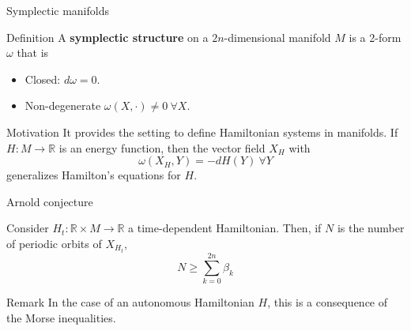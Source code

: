 \documentclass{beamer}
\newcommand{\con}[1]{\mathbb{#1}}
\newcommand{\R}{\con{R}}
\begin{document}
\begin{frame}{Symplectic manifolds}
	\begin{block}{Definition}
		A {\bf symplectic structure} on a $2n$-dimensional manifold $M$ is a 2-form $\omega$ that is
		\begin{itemize}
			\item Closed: $d\omega = 0$.
			\item Non-degenerate $\omega(X,\cdot) \neq 0 \ \forall X$.
		\end{itemize}
	\end{block}

	\begin{block}{Motivation}
		It provides the setting to define Hamiltonian systems in manifolds. If $H : M \rightarrow \R$ is an energy function, then the vector field $X_H$ with
		\[\omega(X_H,Y) = -dH(Y) \ \forall Y\]
		generalizes Hamilton's equations for $H$.
	\end{block}
\end{frame}

\begin{frame}{Arnold conjecture}
	\begin{theorem}
		Consider $H_t : \R \times M \rightarrow \R$ a time-dependent Hamiltonian. Then, if $N$ is the number of periodic orbits of $X_{H_t}$,
		\[N \geq \sum_{k=0}^{2n} \beta_k\]
	\end{theorem}

	\begin{block}{Remark}
		In the case of an autonomous Hamiltonian $H$, this is a consequence of the Morse inequalities.
	\end{block}
\end{frame}
\end{document}
